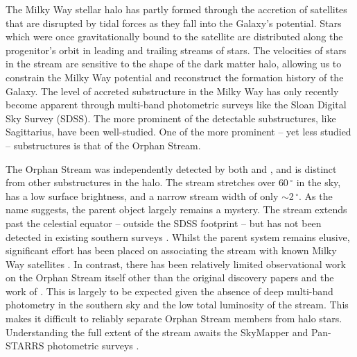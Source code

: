 The Milky Way stellar halo has partly formed through the accretion of satellites that are disrupted by tidal forces as they fall into the Galaxy's potential. Stars which were once gravitationally bound to the satellite are distributed along the progenitor's orbit in leading and trailing streams of stars. The velocities of stars in the stream are sensitive to the shape of the dark matter halo, allowing us to constrain the Milky Way potential and reconstruct the formation history of the Galaxy. The level of accreted substructure in the Milky Way has only recently become apparent through multi-band photometric surveys like the Sloan Digital Sky Survey (SDSS). The more prominent of the detectable substructures, like Sagittarius, have been well-studied. One of the more prominent \--- yet less studied \--- substructures is that of the Orphan Stream. 


The Orphan Stream was independently detected by both \citet{Grillmair_2006} and \citet{Belokurov_et-al_2006}, and is distinct from other substructures in the halo. The stream stretches over $60\,^\circ$ in the sky, has a low surface brightness, and a narrow stream width of only $\sim$2\,$^\circ$.  As the name suggests, the parent object largely remains a mystery. The stream extends past the celestial equator \--- outside the SDSS footprint \--- but has not been detected in existing southern surveys \citep{Newberg_et-al_2010}. Whilst the parent system remains elusive, significant effort has been placed on associating the stream with known Milky Way satellites \citep{Zucker_et-al_2006, Fellhaur_et-al_2007,Jin_Lynden_Bell_2007,Sales_et-al_2008}. In contrast, there has been relatively limited observational work on the Orphan Stream itself other than the original discovery papers \citep{Grillmair_2006, Belokurov_et-al_2006, Belokurov_et-al_2007} and the work of \citet{Newberg_et-al_2010}. This is largely to be expected given the absence of deep multi-band photometry in the southern sky and the low total luminosity of the stream. This makes it difficult to reliably separate Orphan Stream members from halo stars. Understanding the full extent of the stream awaits the SkyMapper and Pan-STARRS photometric surveys \citep{Keller_et-al_2007, Hodapp_et-al_2004}.

